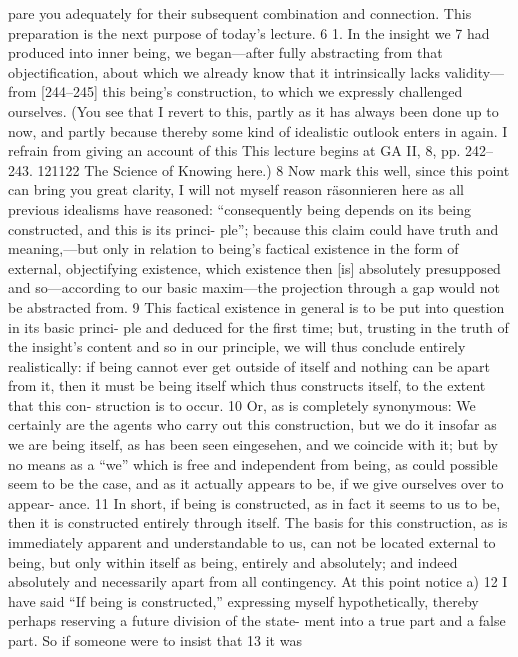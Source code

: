 pare you adequately for their subsequent combination and connection. This
preparation is the next purpose of today’s lecture. 6
1. In the insight we 7 had produced into inner being, we began—after
fully abstracting from that objectification, about which we already know that
it intrinsically lacks validity—from [244–245] this being’s construction, to
which we expressly challenged ourselves. (You see that I revert to this, partly
as it has always been done up to now, and partly because thereby some kind
of idealistic outlook enters in again. I refrain from giving an account of this
This lecture begins at GA II, 8, pp. 242–243.
121122
The Science of Knowing
here.) 8 Now mark this well, since this point can bring you great clarity, I will
not myself reason {räsonnieren} here as all previous idealisms have reasoned:
“consequently being depends on its being constructed, and this is its princi-
ple”; because this claim could have truth and meaning,—but only in relation
to being’s factical existence in the form of external, objectifying existence,
which existence then [is] absolutely presupposed and so—according to our
basic maxim—the projection through a gap would not be abstracted from. 9
This factical existence in general is to be put into question in its basic princi-
ple and deduced for the first time; but, trusting in the truth of the insight’s
content and so in our principle, we will thus conclude entirely realistically: if
being cannot ever get outside of itself and nothing can be apart from it, then
it must be being itself which thus constructs itself, to the extent that this con-
struction is to occur. 10 Or, as is completely synonymous: We certainly are the
agents who carry out this construction, but we do it insofar as we are being
itself, as has been seen {eingesehen}, and we coincide with it; but by no means
as a “we” which is free and independent from being, as could possible seem to
be the case, and as it actually appears to be, if we give ourselves over to appear-
ance. 11 In short, if being is constructed, as in fact it seems to us to be, then it
is constructed entirely through itself. The basis for this construction, as is
immediately apparent and understandable to us, can not be located external to
being, but only within itself as being, entirely and absolutely; and indeed
absolutely and necessarily apart from all contingency.
At this point notice a) 12 I have said “If being is constructed,” expressing
myself hypothetically, thereby perhaps reserving a future division of the state-
ment into a true part and a false part. So if someone were to insist that 13 it was
